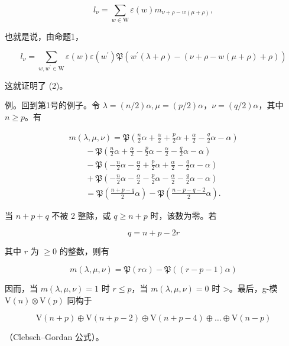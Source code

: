 \[
l _ {\nu} = \sum_ {w \in \mathrm{W}} \varepsilon (w) m _ {\nu + \rho - w (\mu + \rho)},
\]

也就是说，由命题1，

\[
l _ {\nu} = \sum_ {w, w ^ {\prime} \in \mathrm{W}} \varepsilon (w) \varepsilon (w ^ {\prime}) \mathfrak {P} (w ^ {\prime} (\lambda + \rho) - (\nu + \rho - w (\mu + \rho) + \rho))
\]

这就证明了 (2)。

例。回到第1号的例子。令 \(\lambda = (n/2)\alpha, \mu = (p/2)\alpha\)，\(\nu = (q/2)\alpha\)，其中 \(n \geq p\)。有

\[
\begin{array}{l} m (\lambda , \mu , \nu) = \mathfrak {P} \left(\frac {n}{2} \alpha + \frac {\alpha}{2} + \frac {p}{2} \alpha + \frac {\alpha}{2} - \frac {q}{2} \alpha - \alpha\right) \\ \qquad - \mathfrak {P} \left(\frac {n}{2} \alpha + \frac {\alpha}{2} - \frac {p}{2} \alpha - \frac {\alpha}{2} - \frac {q}{2} \alpha - \alpha\right) \\ \qquad - \mathfrak {P} \left(- \frac {n}{2} \alpha - \frac {\alpha}{2} + \frac {p}{2} \alpha + \frac {\alpha}{2} - \frac {q}{2} \alpha - \alpha\right) \\ \qquad + \mathfrak {P} \left(- \frac {n}{2} \alpha - \frac {\alpha}{2} - \frac {p}{2} \alpha - \frac {\alpha}{2} - \frac {q}{2} \alpha - \alpha\right) \\ \qquad = \mathfrak {P} \left(\frac {n + p - q}{2} \alpha\right) - \mathfrak {P} \left(\frac {n - p - q - 2}{2} \alpha\right). \end{array}
\]

当 \(n + p + q\) 不被 2 整除，或 \(q \geq n + p\) 时，该数为零。若

\[
q = n + p - 2 r
\]

其中 \(r\) 为 \(\geq 0\) 的整数，则有

\[
m (\lambda , \mu , \nu) = \mathfrak {P} (r \alpha) - \mathfrak {P} ((r - p - 1) \alpha)
\]

因而，当 \(m(\lambda,\mu,\nu)=1\) 时 \(r\leq p\)，当 \(m(\lambda,\mu,\nu)=0\) 时 \textgreater。最后，g-模 \(\mathrm{V}(n)\otimes\mathrm{V}(p)\) 同构于

\[
\mathrm{V} (n + p) \oplus \mathrm{V} (n + p - 2) \oplus \mathrm{V} (n + p - 4) \oplus \dots \oplus \mathrm{V} (n - p)
\]

（Clebsch–Gordan 公式）。

